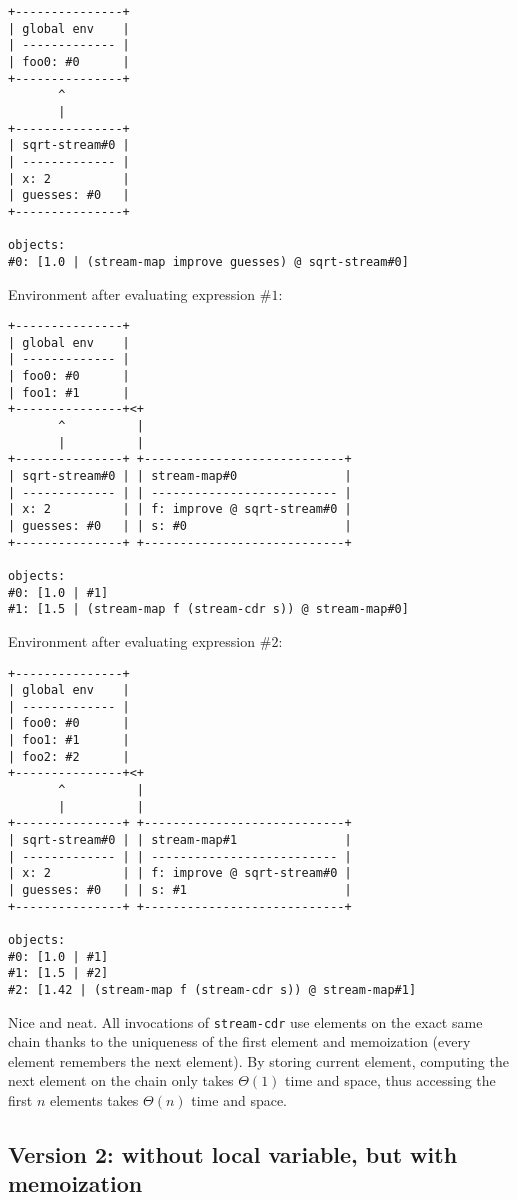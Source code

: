 \documentclass[../main.tex]{subfiles}
\begin{document}
\begin{lstlisting}
+---------------+
| global env    |
| ------------- |
| foo0: #0      |
+---------------+
       ^
       |
+---------------+
| sqrt-stream#0 |
| ------------- |
| x: 2          |
| guesses: #0   |
+---------------+

objects:
#0: [1.0 | (stream-map improve guesses) @ sqrt-stream#0]
\end{lstlisting}

Environment after evaluating expression $\#1$:

\begin{lstlisting}
+---------------+
| global env    |
| ------------- |
| foo0: #0      |
| foo1: #1      |
+---------------+<+
       ^          |
       |          |
+---------------+ +----------------------------+
| sqrt-stream#0 | | stream-map#0               |
| ------------- | | -------------------------- |
| x: 2          | | f: improve @ sqrt-stream#0 |
| guesses: #0   | | s: #0                      |
+---------------+ +----------------------------+

objects:
#0: [1.0 | #1]
#1: [1.5 | (stream-map f (stream-cdr s)) @ stream-map#0]
\end{lstlisting}

Environment after evaluating expression $\#2$:

\begin{lstlisting}
+---------------+
| global env    |
| ------------- |
| foo0: #0      |
| foo1: #1      |
| foo2: #2      |
+---------------+<+
       ^          |
       |          |
+---------------+ +----------------------------+
| sqrt-stream#0 | | stream-map#1               |
| ------------- | | -------------------------- |
| x: 2          | | f: improve @ sqrt-stream#0 |
| guesses: #0   | | s: #1                      |
+---------------+ +----------------------------+

objects:
#0: [1.0 | #1]
#1: [1.5 | #2]
#2: [1.42 | (stream-map f (stream-cdr s)) @ stream-map#1]
\end{lstlisting}

Nice and neat. All invocations of \lstinline{stream-cdr} use elements on the exact same chain thanks to the uniqueness of the first element and memoization (every element remembers the next element). By storing current element, computing the next element on the chain only takes $\Theta (1)$ time and space, thus accessing the first $n$ elements takes $\Theta (n)$ time and space.

\subsection{Version 2: without local variable, but with memoization}
\end{document}
